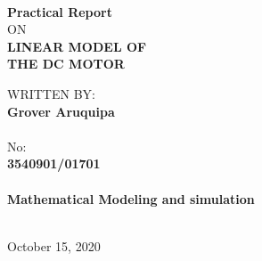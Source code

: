 \documentclass[12pt]{article}
\begin{document}
\begin{titlepage}
	
	\begin{multicols}{2}
		
	
	\begin{flushright}
	
		
		
		
		
		\vspace*{4cm}
		
		\textbf{\\ Practical Report\\}
		\vspace*{5cm}
		ON\\
		\vspace{1cm}
		\textbf{\huge
			LINEAR MODEL OF \\
		\vspace{0.33cm}
			THE
			 DC MOTOR
		}
		
		\vspace{0.5cm}
		
		 \textrm{WRITTEN BY:\\
		 	\textbf{Grover Aruquipa\\
		 	}\\
	 		\vspace*{1 cm}
	 	\textrm{ No:\\
	 		\textbf{3540901/01701} \\
		 }}	
		 \vspace*{1 cm}
	 	\makebox{}\\
		 \textbf{Mathematical Modeling and simulation}
		\vspace{0.8cm}
		
		
		
		\makebox{}\\
		October 15, 2020
		
	\end{flushright}

	\end{multicols}

\end{titlepage}
\restoregeometry

\newpage

\pagestyle{fancy}
\thispagestyle{plain}
\end{document}
